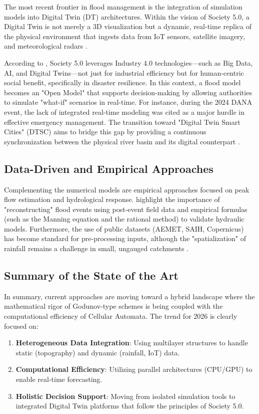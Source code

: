 The most recent frontier in flood management is the integration of simulation models into Digital Twin (DT) architectures. 
Within the vision of Society 5.0, a Digital Twin is not merely a 3D visualization but a dynamic, real-time replica of the 
physical environment that ingests data from IoT sensors, satellite imagery, and meteorological radars \parencite{FonsecaiCasas2026}.

According to \cite{FonsecaiCasas2026}, Society 5.0 leverages Industry 4.0 technologies—such as Big Data, AI, and Digital 
Twins—not just for industrial efficiency but for human-centric social benefit, specifically in disaster resilience. In this 
context, a flood model becomes an "Open Model" that supports decision-making by allowing authorities to simulate "what-if" 
scenarios in real-time. For instance, during the 2024 DANA event, the lack of integrated real-time modeling was cited as a 
major hurdle in effective emergency management. The transition toward "Digital Twin Smart Cities" (DTSC) 
aims to bridge this gap by providing a continuous synchronization between the physical river basin and its digital counterpart 
\parencite{Wu2024}.


\subsection{Data-Driven and Empirical Approaches}

Complementing the numerical models are empirical approaches focused on peak flow estimation and hydrological response. 
\cite{Muoz2025} highlight the importance of "reconstructing" flood events using post-event field data and empirical 
formulas (such as the Manning equation and the rational method) to validate hydraulic models. Furthermore, the use of 
public datasets (AEMET, SAIH, Copernicus) has become standard for pre-processing inputs, although the "spatialization" 
of rainfall remains a challenge in small, ungauged catchments \parencite{Vasileva2021}.


\subsection{Summary of the State of the Art}

In summary, current approaches are moving toward a hybrid landscape where the mathematical rigor of Godunov-type schemes 
is being coupled with the computational efficiency of Cellular Automata. The trend for 2026 is clearly focused on:

\begin{enumerate}
    \item \textbf{Heterogeneous Data Integration}: Using multilayer structures to handle static (topography) and dynamic 
    (rainfall, IoT) data.
    \item \textbf{Computational Efficiency}: Utilizing parallel architectures (CPU/GPU) to enable real-time forecasting.
    \item \textbf{Holistic Decision Support}: Moving from isolated simulation tools to integrated Digital Twin platforms 
    that follow the principles of Society 5.0.
\end{enumerate}


